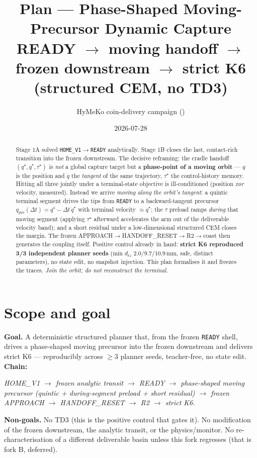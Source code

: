 \documentclass[11pt]{article}
\title{\textbf{Plan --- Phase-Shaped Moving-Precursor Dynamic Capture}\\[2pt]
\large READY $\rightarrow$ moving handoff $\rightarrow$ frozen downstream $\rightarrow$ strict K6 (structured CEM, no TD3)}
\author{HyMeKo coin-delivery campaign \quad(\code{recovery/coin-r9-causal-residual-delivery})}
\date{2026-07-28}
\newcommand{\code}[1]{\texttt{\small #1}}
\begin{document}
\maketitle

\begin{abstract}
\noindent Stage 1A solved \code{HOME\_V1}$\rightarrow$\code{READY} analytically. Stage 1B closes the last, contact-rich
transition into the frozen downstream. The decisive reframing: the cradle handoff $(q^\star,\dot q^\star,\tau^\star)$ is
\emph{not} a global capture target but a \textbf{phase-point of a moving orbit} --- $q$ is the position and $\dot q$ the
\emph{tangent} of the same trajectory, $\tau^\star$ the control-history memory. Hitting all three jointly under a
terminal-state objective is ill-conditioned (position \emph{xor} velocity, measured). Instead we arrive \emph{moving
along the orbit's tangent}: a quintic terminal segment drives the tips from \code{READY} to a backward-tangent precursor
$q_{\mathrm{pre}}(\Delta t)=q^\star-\Delta t\,\dot q^\star$ with terminal velocity $\approx\dot q^\star$; the $\tau$
preload ramps \emph{during} that moving segment (applying $\tau^\star$ afterward accelerates the arm out of the
deliverable velocity band); and a short residual under a low-dimensional structured CEM closes the margin. The frozen
APPROACH$\rightarrow$HANDOFF\_RESET$\rightarrow$R2$\rightarrow$coast then generates the coupling itself. Positive control
already in hand: \textbf{strict K6 reproduced 3/3 independent planner seeds} (min $d_{tz}$ 2.0/9.7/10.9\,mm, safe, distinct
parameters), no state edit, no snapshot injection. This plan formalises it and freezes the traces. \emph{Join the orbit;
do not reconstruct the terminal.}
\end{abstract}

\section{Scope and goal}
\textbf{Goal.} A deterministic structured planner that, from the frozen \code{READY} shell, drives a phase-shaped moving
precursor into the frozen downstream and delivers strict K6 --- reproducibly across $\ge 3$ planner seeds, teacher-free,
no state edit. \textbf{Chain:}
\begin{center}\itshape HOME\_V1 $\to$ frozen analytic transit $\to$ READY $\to$ phase-shaped moving precursor (quintic +
during-segment preload + short residual) $\to$ frozen APPROACH $\to$ HANDOFF\_RESET $\to$ R2 $\to$ strict K6.\end{center}
\textbf{Non-goals.} No TD3 (this is the positive control that gates it). No modification of the frozen downstream, the
analytic transit, or the physics/monitor. No re-characterisation of a different deliverable basin unless this fork
regresses (that is fork B, deferred).
\end{document}
